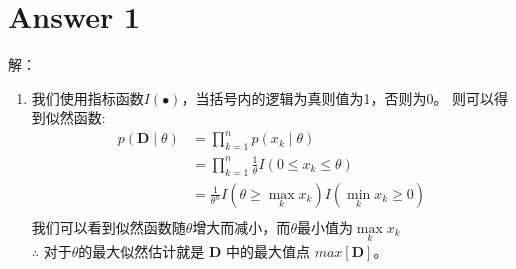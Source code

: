 \documentclass[a4paper,11pt,onecolumn,oneside,UTF8]{article}
\begin{document}
\section*{Answer 1}
解：
\begin{enumerate}
    \item 我们使用指标函数$I\left(\bullet\right)$，当括号内的逻辑为真则值为1，否则为0。
          则可以得到似然函数:
          $$
              \begin{aligned}
                  p\left(\bm D \mid \theta \right) & = \prod\limits_{k=1}^np\left(x_k \mid \theta \right) \\
                                                   & = \prod\limits_{k=1}^n\frac{1}{\theta}I\left(0 \leq
                  x_k \leq \theta\right)                                                                  \\
                                                   & = \frac{1}{\theta^n}I\left(\theta \geq \mathop{max}
                  \limits_{k} x_k\right)I\left(\mathop{min}\limits_{k} x_k \geq 0\right)                  \\
              \end{aligned}
          $$
          我们可以看到似然函数随$\theta$增大而减小，而$\theta$最小值为$\mathop{max}\limits_{k} x_k$\\
          $\therefore$ 对于$\theta$的最大似然估计就是 \textbf{D} 中的最大值点 $max[\textbf{D}]。$


\end{enumerate}
\end{document}
